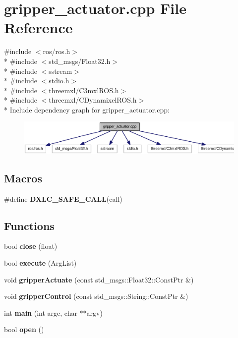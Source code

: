 \section{gripper\-\_\-actuator.\-cpp File Reference}
\label{gripper__actuator_8cpp}
{\ttfamily \#include $<$ros/ros.\-h$>$}\\*
{\ttfamily \#include $<$std\-\_\-msgs/\-Float32.\-h$>$}\\*
{\ttfamily \#include $<$sstream$>$}\\*
{\ttfamily \#include $<$stdio.\-h$>$}\\*
{\ttfamily \#include $<$threemxl/\-C3mxl\-R\-O\-S.\-h$>$}\\*
{\ttfamily \#include $<$threemxl/\-C\-Dynamixel\-R\-O\-S.\-h$>$}\\*
Include dependency graph for gripper\-\_\-actuator.\-cpp\-:
\nopagebreak
\begin{figure}[H]
\begin{center}
\leavevmode
\includegraphics[width=350pt]{gripper__actuator_8cpp__incl}
\end{center}
\end{figure}
\subsection*{Macros}
\begin{DoxyCompactItemize}
\item 
\#define {\bf D\-X\-L\-C\-\_\-\-S\-A\-F\-E\-\_\-\-C\-A\-L\-L}(call)
\end{DoxyCompactItemize}
\subsection*{Functions}
\begin{DoxyCompactItemize}
\item 
bool {\bf close} (float)
\item 
bool {\bf execute} (Arg\-List)
\item 
void {\bf gripper\-Actuate} (const std\-\_\-msgs\-::\-Float32\-::\-Const\-Ptr \&)
\item 
void {\bf gripper\-Control} (const std\-\_\-msgs\-::\-String\-::\-Const\-Ptr \&)
\item 
int {\bf main} (int argc, char $\ast$$\ast$argv)
\item 
bool {\bf open} ()
\end{DoxyCompactItemize}
